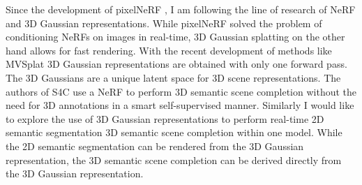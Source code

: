 Since the development of pixelNeRF \cite{pixelnerf}, I am following the line of research of NeRF and 3D Gaussian representations.
While pixelNeRF solved the problem of conditioning NeRFs on images in real-time, 
3D Gaussian splatting on the other hand allows for fast rendering. With the recent development of methods like MVSplat \cite{mvsplat}
3D Gaussian representations are obtained with only one forward pass. The 3D Gaussians are a unique 
latent space for 3D scene representations.
The authors of S4C \cite{s4c} use a NeRF to perform 3D semantic scene completion 
without the need for 3D annotations in a smart self-supervised manner. Similarly I would like to explore the use of 
3D Gaussian representations to perform real-time 2D semantic segmentation
3D semantic scene completion within one model. While the 2D semantic segmentation can be rendered from the 3D Gaussian representation,
the 3D semantic scene completion can be derived directly from the 3D Gaussian representation.
